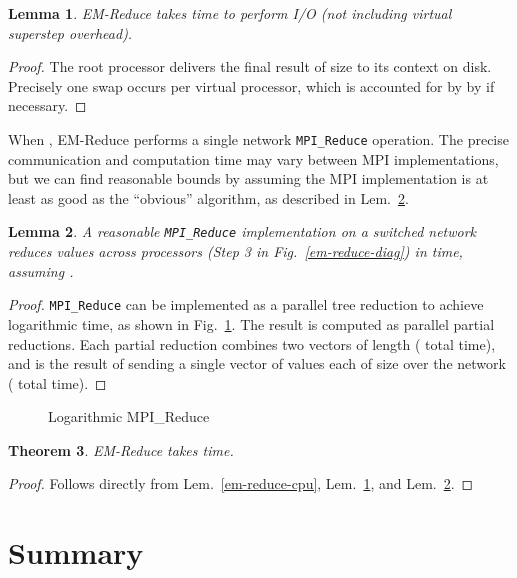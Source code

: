 \documentclass[12pt]{carletoncsthesis}
\newtheorem{thm}{Theorem}[section]
\newtheorem{lemma}[thm]{Lemma}
\begin{document}
\begin{lemma}
\label{em-reduce-io}
{\sc EM-Reduce} takes  time to perform I/O
(not including virtual superstep overhead).
\end{lemma}
\begin{proof}
The root processor delivers the final result of size  to its context
on disk.  Precisely one swap occurs per virtual processor, which is accounted
for by by  if necessary.
\end{proof}

When , {\sc EM-Reduce} performs a single network {\tt MPI\_Reduce}
operation.  The precise communication and computation time may vary
between MPI implementations, but we can find reasonable bounds by assuming
the MPI implementation is at least as good as the ``obvious'' algorithm, as
described in Lem.~\ref{mpi-reduce-time}.

\begin{lemma}
\label{mpi-reduce-time}
A reasonable {\tt MPI\_Reduce} implementation on a switched network reduces
 values across  processors (Step 3 in Fig.~\ref{em-reduce-diag}) in
 time, assuming .
\end{lemma}
\begin{proof}
{\tt MPI\_Reduce} can be implemented as a parallel tree reduction to achieve
logarithmic time, as shown in Fig.~\ref{mpi-reduce}.  The result is computed
as  parallel partial reductions.  Each partial reduction combines
two vectors of length  ( total time), and is the result of
sending a single vector of  values each of size  over the network
( total time).
\end{proof}

\begin{figure}[ht]
\begin{center}
\caption{Logarithmic {\sc MPI\_Reduce}}
\label{mpi-reduce}
\end{center}
\end{figure}

\begin{thm}
\label{em-reduce-time}
{\sc EM-Reduce} takes  time.
\end{thm}
\begin{proof}
Follows directly from Lem.~\ref{em-reduce-cpu}, Lem.~\ref{em-reduce-io},
and Lem.~\ref{mpi-reduce-time}.
\end{proof}


\clearpage
\section{Summary}
\end{document}
